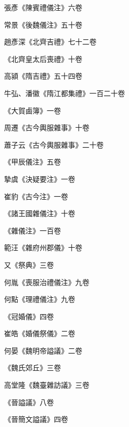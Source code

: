 \begin{pinyinscope}
 張彥《陳賓禮儀注》六卷



 常景《後魏儀注》五十卷



 趙彥深《北齊吉禮》七十二卷



 《北齊皇太后喪禮》十卷



 高潁《隋吉禮》五十四卷



 牛弘、潘徽《隋江都集禮》一百二十卷



 《大賀鹵簿》一卷



 周遷《古今輿服雜事》十卷



 蕭子云《古今輿服雜事》二十卷



 《甲辰儀注》五卷



 摯虞《決疑要注》一卷



 崔豹《古今注》一卷



 《諸王國雜儀注》十卷



 《雜儀注》一百卷



 範汪《雜府州郡儀》十卷



 又《祭典》三卷



 何胤《喪服治禮儀注》九卷



 何點《理禮儀注》九卷



 《冠婚儀》四卷



 崔皓《婚儀祭儀》二卷



 何晏《魏明帝謚議》二卷



 《魏氏郊丘》三卷



 高堂隆《魏臺雜訪議》三卷



 《晉謚議》八卷



 《晉簡文謚議》四卷




\end{pinyinscope}
